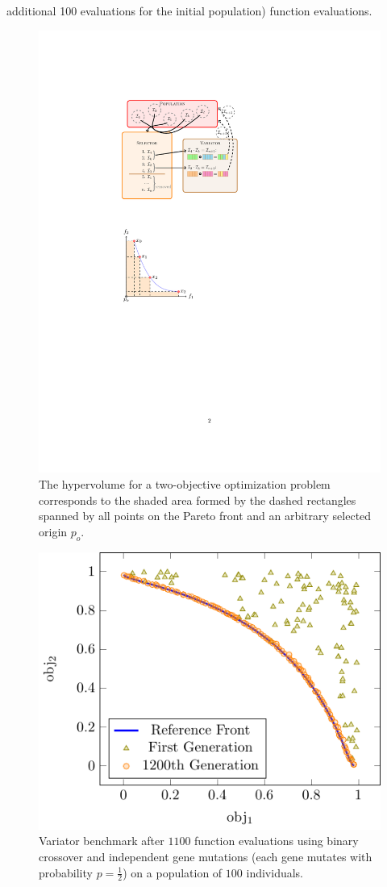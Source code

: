  additional 100 evaluations for the initial population) function evaluations.
 \begin{figure}
 	\centering
 	\includegraphics[width=0.4\linewidth]{hypervolume}
 	\caption{The hypervolume for a two-objective optimization problem
 		corresponds to the shaded area formed by the dashed rectangles spanned by
 		all points on the Pareto front and an arbitrary selected origin $p_o$.}
 	\label{fig:hypervolume}
 \end{figure}
\begin{figure}
  \centering
    \includegraphics[width=0.6\linewidth]{valid_front}
  \caption{Variator benchmark after $1100$ function evaluations using binary
           crossover and independent gene mutations (each gene mutates with
           probability $p=\frac{1}{2}$) on a population of $100$
           individuals.}
  \label{fig:pisa_bench}
\end{figure}
